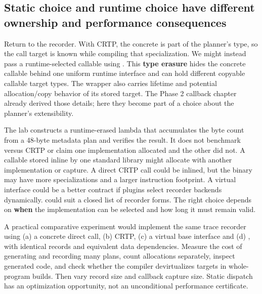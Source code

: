 \subsection{Static choice and runtime choice have different ownership and performance consequences}\label{05-engine-i-ch005-static-choice-and-runtime-choice-have-different-ownership-and-performance-consequences}

\hypertarget{05-engine-i-ch005-static-choice-and-runtime-choice-have-different-ownership-and-performance-consequences}{}

Return to the recorder. With CRTP, the concrete  is part of the planner's type, so the call target is known while compiling that specialization. We might instead pass a runtime-selected callable using . This \textbf{type erasure} hides the concrete callable behind one uniform runtime interface and can hold different copyable callable target types. The wrapper also carries lifetime and potential allocation/copy behavior of its stored target. The Phase 2 callback chapter already derived those details; here they become part of a choice about the planner's extensibility.

The lab constructs a runtime-erased lambda that accumulates the byte count from a 48-byte metadata plan and verifies the result. It does not benchmark  versus CRTP or claim one implementation allocated and the other did not. A callable stored inline by one standard library might allocate with another implementation or capture. A direct CRTP call could be inlined, but the binary may have more specializations and a larger instruction footprint. A virtual interface could be a better contract if plugins select recorder backends dynamically.  could suit a closed list of recorder forms. The right choice depends on \textbf{when} the implementation can be selected and how long it must remain valid.

A practical comparative experiment would implement the same trace recorder using (a) a concrete direct call, (b) CRTP, (c) a virtual base interface and (d) , with identical records and equivalent data dependencies. Measure the cost of generating and recording many plans, count allocations separately, inspect generated code, and check whether the compiler devirtualizes targets in whole-program builds. Then vary record size and callback capture size. Static dispatch has an optimization opportunity, not an unconditional performance certificate.

